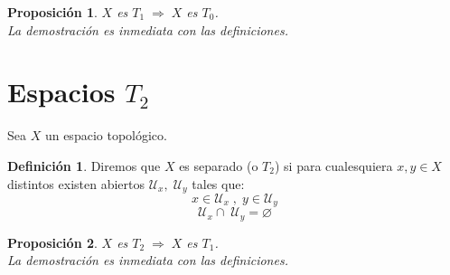 \documentclass[12pt,twoside]{report}
\theoremstyle{azul}
\theoremstyle{azul2}
\theoremstyle{plain}
\newtheorem*{prop}{Proposición}
\theoremstyle{definition}
\newtheorem*{defi}{Definición}
\theoremstyle{remark}
\begin{document}
\begin{prop}
$X$ es $T_1 \; \Rightarrow \; X$ es $T_0$.\\
La demostración es inmediata con las definiciones.
\end{prop}

\section{Espacios $T_2$} \label{espt2}

Sea $X$ un espacio topológico.
\begin{defi}
Diremos que $X$ es separado (o $T_2$) si para cualesquiera $x, y \in X$ distintos existen abiertos $\mathcal{U}_x ,\; \mathcal{U}_y$ tales que: $$x \in \mathcal{U}_x \; , \; y \in \mathcal{U}_y$$ $$ \mathcal{U}_x \cap  \; \mathcal{U}_y = \varnothing$$ 
\end{defi} 

\begin{prop}
$X$ es $T_2 \; \Rightarrow \; X$ es $T_1$.\\
La demostración es inmediata con las definiciones.
\end{prop}
\end{document}
